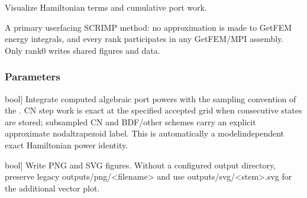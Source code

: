 \documentclass[letterpaper,10pt,english]{sphinxmanual}
\begin{document}
\begin{fulllineitems}
\begin{fulllineitems}
\end{fulllineitems}


\begin{fulllineitems}
\label{\detokenize{scrimp:scrimp.dphs.DPHS.plot_Hamiltonian}}
\pysigstartsignatures
\pysiglinewithargsret
{}
{\sphinxparamcomma {}\sphinxparamcomma {}\sphinxparamcomma {}\sphinxparamcomma {}\sphinxparamcomma {}}
{}
\pysigstopsignatures
\sphinxAtStartPar
Visualize  Hamiltonian terms and cumulative port work.

\sphinxAtStartPar
A primary user\sphinxhyphen{}facing SCRIMP method: no approximation is made
to GetFEM energy integrals, and every rank participates in any
GetFEM/MPI assembly. Only rank0 writes shared figures and data.


\subsubsection{Parameters}
\label{\detokenize{scrimp:id1}}\begin{description}
\sphinxlineitem{with\_powers}{[}bool{]}
\sphinxAtStartPar
Integrate computed algebraic port powers with the sampling
convention of the . CN step work
is exact at the specified accepted grid when consecutive
states are stored; subsampled CN and BDF/other schemes
carry an explicit approximate nodal\sphinxhyphen{}trapezoid label.
This is  automatically a model\sphinxhyphen{}independent exact
Hamiltonian power identity.

\sphinxlineitem{save\_figure}{[}bool{]}
\sphinxAtStartPar
Write PNG and SVG figures. Without a configured output
directory, preserve legacy outputs/png/\textless{}filename\textgreater{} and
use outputs/svg/\textless{}stem\textgreater{}.svg for the additional vector plot.


\end{description}
\end{fulllineitems}
\end{fulllineitems}
\end{document}
